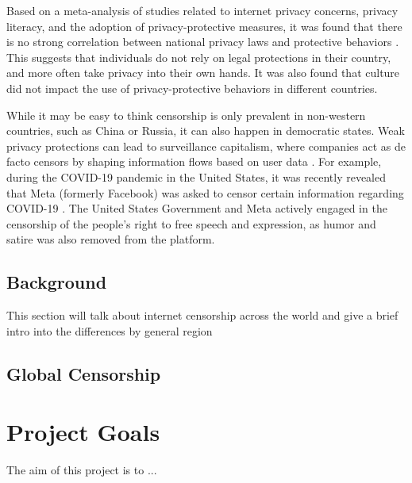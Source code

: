 Based on a meta-analysis of studies related to internet privacy concerns, privacy literacy, and the adoption of privacy-protective measures, it was found that there is no strong correlation between national privacy laws and protective behaviors \cite{baruh2017online}. This suggests that individuals do not rely on legal protections in their country, and more often take privacy into their own hands. It was also found that culture did not impact the use of privacy-protective behaviors in different countries. 

While it may be easy to think censorship is only prevalent in non-western countries, such as China or Russia, it can also happen in democratic states. Weak privacy protections can lead to surveillance capitalism, where companies act as de facto censors by shaping information flows based on user data \cite{schwartz1999internet}. For example, during the COVID-19 pandemic in the United States, it was recently revealed that Meta (formerly Facebook) was asked to censor certain information regarding COVID-19 \cite{pbsZuckerbergSays}. The United States Government and Meta actively engaged in the censorship of the people's right to free speech and expression, as humor and satire was also removed from the platform.

\subsection{Background}

This section will talk about internet censorship across the world and give a brief intro into the differences by general region

\subsection{Global Censorship}

\section{Project Goals}

The aim of this project is to ...


